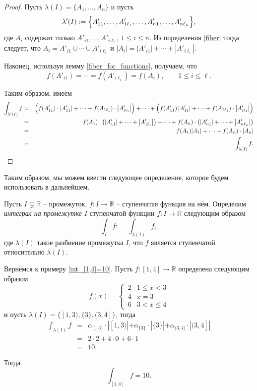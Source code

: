\begin{proof}
    Пусть $\lambda(I) = \{ A_1,\ldots, A_n \}$ и пусть 
    \[
     \lambda'(I) : = \Bigl\{A_{11}', \ldots, A'_{1\ell_1},\ldots, A'_{n1},\ldots, A'_{n\ell_n} \Bigr\},
    \]
    где $A_i$ содержит только $A'_{i1},\ldots, A'_{i\ell_i}$, $1\le i \le n$. Из определения \ref{fiber} тогда следует, что $A_i = A'_{i1} \cup \cdots \cup A'_{i\ell_i}$ и $|A_i| = |A'_{i1}| + \cdots + |A'_{i\ell_i}|$.
    
    Наконец, используя лемму \ref{fiber_for_functions}, получаем, что
    \[
     f(A'_{i1}) = \cdots = f(A'_{i\ell_i}) = f(A_i), \qquad 1 \le i \le \ell.
    \]

    Таким образом, имеем
    \begin{eqnarray*}
        \int_{\lambda'(I)}f &=& \Bigl(f(A_{11}') \cdot \left| A'_{11} \right| + \cdots + f(A_{1\ell_1})\cdot \left|A'_{i\ell_1}\right|\Bigr) + \cdots + \Bigl(f(A_{11}') \left|A_{11}'\right| + \cdots + f(A_{1\ell_1})\cdot \left|A'_{i\ell_1}\right| \Bigr) \\
        &=& f(A_1) \cdot \left( \left| A'_{11}  \right| + \cdots + \left| A'_{1\ell_1} \right| \right) + \cdots + f(A_n) \cdot \left( \left| A'_{n1}  \right| + \cdots + \left| A'_{n\ell_n} \right| \right) \\
        &=& f(A_1) |A_1| + \cdots + f(A_n)\cdot |A_n| \\
        &=& \int_{\lambda(I)}f.
    \end{eqnarray*}
\end{proof}


Таким образом, мы можем ввести следующее определение, которое будем использовать в дальнейшем.

\begin{definition}\label{int_of_p.c}
    Пусть $I \subsetneq \mathbb{R}$ -- промежуток, $f:I \to \mathbb{R}$ -- ступенчатая функция на нём. Определим \textit{интеграл на промежутке $I$} ступенчатой функции $f:I \to \mathbb{R}$ следующим образом
    \[
     \int_If: =  \int_{\lambda(I)}f,
    \]
    где $\lambda(I)$ такое разбиение промежутка $I$, что $f$ является ступенчатой относительно $\lambda(I).$
\end{definition}


\begin{example}
Вернёмся к примеру \ref{int_[1,4]=10}. Пусть $f: [1,4] \to \mathbb{R}$ определена следующим образом
    \[
     f(x)  = \begin{cases}
          \, 2 & 1 \le x <3 \\
          \, 4 & x = 3 \\
          \, 6 & 3< x \le 4
     \end{cases}
    \]
    и пусть $\lambda(I) = \{ [1,3), \{3\}, (3,4] \}$, тогда
 \begin{eqnarray*}
  \int_{\lambda(I)} f  &=& \alpha_{[1,3)}\cdot | [1,3) | + \alpha_{\{3\}}\cdot |\{3\}| + \alpha_{(3,4]} \cdot | (3,4] | \\
  &=& 2 \cdot 2 + 4 \cdot 0 + 6 \cdot 1 \\
  &=& 10.
   \end{eqnarray*}

Тогда
\[
 \int_{[1,4]}f   =10.
\]
\end{example}

